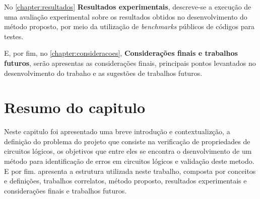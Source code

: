 \par
No \autoref{chapter:resultados} \textbf{Resultados experimentais}, descreve-se a execução de uma avaliação experimental sobre os resultados obtidos no desenvolvimento do método proposto, por meio da utilização de \textit{benchmarks} públicos de códigos para testes.


\par
E, por fim, no \autoref{chapter:consideracoes}, \textbf{Considerações finais e trabalhos futuros}, serão apresentas as considerações finais, principais pontos levantados no desenvolvimento do trabaho e as sugestões de trabalhos futuros. 

\section{Resumo do capitulo}
\par
Neste capitulo foi apresentado uma breve introdução e contextualizção, a definição do problema do projeto que consiste na verificação de propriedades de circuitos lógicos, os objetivos que entre eles se encontra o dsenvolvimento de um método para identificação de erros em circuitos lógicos e validação deste metodo. E por fim. apresenta a estrutura utilizada neste trabalho, composta por conceitos e definições, trabalhos correlatos, método proposto, resultados experimentais e considerações finais e trabalhos futuros.